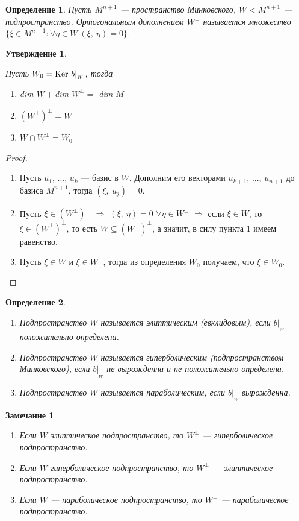 \documentclass[12pt]{article}
\newcommand\tab[1][.5cm]{\hspace*{#1}}
\theoremstyle{plain}
\newtheorem{subtheorem}{Утверждение}[section]
\newtheorem{definition}{Определение}[section]
\newtheorem{remark}{Замечание}
\begin{document}
    \begin{definition}
        Пусть $M^{n+1}$ --- пространство Минковского, $W<M^{n+1}$ --- подпространство. Ортогональным дополнением $W^{\perp}$ называется множество $\{\xi\in M^{n+1}:\forall\eta \in W \ (\xi, \ \eta)=0\}$.
    \end{definition}
    \begin{subtheorem}
        \hypertarget{d15}{}
        Пусть $W_0=\textup{Ker} \ b|_{_W}$, тогда
        \begin{enumerate}
            \item dim $W+$dim $W^{\perp}=$ dim $M$
            \item $(W^{\perp})^{\perp}=W$
            \item $W\cap W^{\perp}=W_0$
        \end{enumerate}
    \end{subtheorem}
    \begin{proof}\tab
        \begin{enumerate}
            \item Пусть $u_1$, ..., $u_k$ --- базис в $W$. Дополним его векторами $u_{k+1}$, ..., $u_{n+1}$ до базиса $M^{n+1}$, тогда $(\xi, \ u_j)=0$.
            \item Пусть $\xi\in(W^{\perp})^{\perp}$ $\Longrightarrow$ $(\xi, \ \eta)=0$ $\forall\eta\in W^{\perp}$ $\Longrightarrow$ если $\xi\in W$, то $\xi\in(W^{\perp})^{\perp}$, то есть $W\subseteq(W^{\perp})^{\perp}$, а значит, в силу пункта 1 имеем равенство.
            \item Пусть $\xi\in W$ и $\xi\in W^{\perp}$, тогда из определения $W_0$ получаем, что $\xi\in W_0$.
        \end{enumerate}
    \end{proof}
    \begin{definition}\tab
        \begin{enumerate}
            \item Подпространство $W$ называется элиптическим (евклидовым), если $b|_{_W}$ положительно определена.
            \item Подпространство $W$ называется гиперболическим (подпространством Минковского), если $b|_{_W}$ не вырожденна и не положительно определена.
            \item Подпространство $W$ называется параболическим, если $b|_{_W}$ вырожденна.
        \end{enumerate}
    \end{definition}
    \begin{remark}\tab
        \hypertarget{16}{}
        \begin{enumerate}
            \item Если $W$ элиптическое подпространство, то $W^{\perp}$ --- гиперболическое подпространство.
            \item Если $W$ гиперболическое подпространство, то $W^{\perp}$ --- элиптическое подпространство.
            \item Если $W$ --- параболическое подпространство, то $W^{\perp}$ --- параболическое подпространство.
        \end{enumerate}
    \end{remark}
\end{document}
